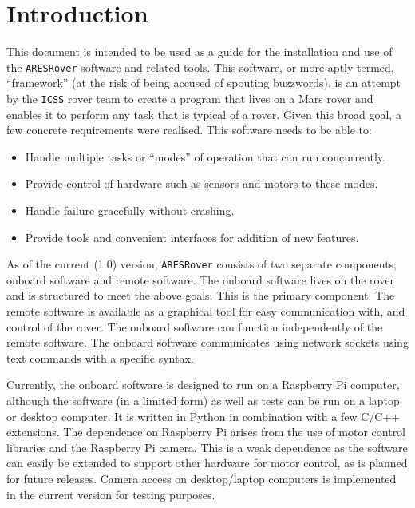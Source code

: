 \section {Introduction}
This document is intended to be used as a guide for the installation and use of the \texttt{ARESRover} software and related tools. This software, or more aptly termed, ``framework'' (at the risk of being accused of spouting buzzwords), is an attempt by the \texttt{ICSS} rover team to create a program that lives on a Mars rover and enables it to perform any task that is typical of a rover. Given this broad goal, a few concrete requirements were realised. This software needs to be able to:
\begin{itemize}
    \item Handle multiple tasks or ``modes'' of operation that can run concurrently.
    \item Provide control of hardware such as sensors and motors to these modes.
    \item Handle failure gracefully without crashing.
    \item Provide tools and convenient interfaces for addition of new features.
\end{itemize}

As of the current (1.0) version, \texttt{ARESRover} consists of two separate components; onboard software and remote software. The onboard software lives on the rover and is structured to meet the above goals. This is the primary component. The remote software is available as a graphical tool for easy communication with, and control of the rover. The onboard software can function independently of the remote software. The onboard software communicates using network sockets using text commands with a specific syntax.

Currently, the onboard software is designed to run on a Raspberry Pi computer, although the software (in a limited form) as well as tests can be run on a laptop or desktop computer. It is written in Python in combination with a few C/C++ extensions. The dependence on Raspberry Pi arises from the use of motor control libraries and the Raspberry Pi camera. This is a weak dependence as the software can easily be extended to support other hardware for motor control, as is planned for future releases. Camera access on desktop/laptop computers is implemented in the current version for testing purposes.

